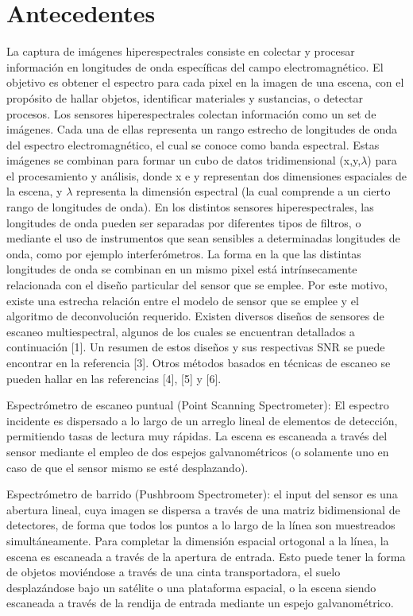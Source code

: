 \documentclass{ctuthesis}
\begin{document}
\section*{Antecedentes}
La captura de imágenes hiperespectrales consiste en colectar y procesar 
información en longitudes de onda específicas del campo electromagnético. El 
objetivo es obtener el espectro para cada pixel en la imagen de una escena, con 
el propósito de hallar objetos, identificar materiales y sustancias, o detectar 
procesos.
Los sensores hiperespectrales colectan información como un  set de imágenes. Cada una de ellas representa un rango estrecho de longitudes de onda del espectro electromagnético, el cual se conoce como banda espectral. Estas imágenes se combinan para formar un cubo de datos tridimensional (x,y,$\lambda$) para el procesamiento y análisis, donde x e y representan dos dimensiones espaciales de la escena, y $\lambda$ representa la dimensión espectral (la cual comprende a un cierto rango de longitudes de onda).
En los distintos sensores hiperespectrales, las longitudes de onda pueden ser separadas por diferentes tipos de filtros, o mediante el uso de instrumentos que sean sensibles a determinadas longitudes de onda, como por ejemplo interferómetros. La forma en la que las distintas longitudes de onda se combinan en un mismo pixel está intrínsecamente relacionada con el diseño particular del sensor que se emplee. Por este motivo, existe una estrecha relación entre el modelo de sensor que se emplee y el algoritmo de deconvolución requerido. Existen diversos diseños de sensores de escaneo multiespectral, algunos de los cuales se encuentran detallados a continuación [1]. Un resumen de estos diseños y sus respectivas SNR se puede encontrar en la referencia [3]. Otros métodos basados en técnicas de escaneo se pueden hallar en las referencias [4], [5] y  [6]. 

Espectrómetro de escaneo puntual (Point Scanning Spectrometer): El espectro incidente es dispersado a lo largo de un arreglo lineal de elementos de detección, permitiendo tasas de lectura muy rápidas. La escena es escaneada  a través del sensor mediante el empleo de dos espejos galvanométricos (o solamente uno en caso de que el sensor mismo se esté desplazando).

Espectrómetro de barrido (Pushbroom Spectrometer): el input del sensor es una abertura lineal, cuya imagen se dispersa a través de una matriz bidimensional de detectores, de forma que todos los puntos a lo largo de la línea son muestreados simultáneamente. Para completar la dimensión espacial ortogonal a la línea, la escena es escaneada a través de la apertura de entrada. Esto puede tener la forma de objetos moviéndose a través de una cinta transportadora, el suelo desplazándose bajo un satélite o una plataforma espacial, o la escena siendo escaneada a través de la rendija de entrada mediante un espejo galvanométrico.
\end{document}
